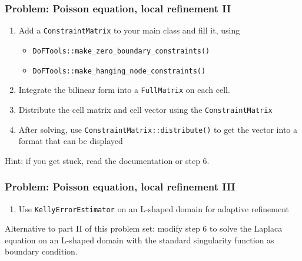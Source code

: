 \begin{frame}
  \frametitle{Problem: Poisson equation, local refinement II}
  \begin{enumerate}
  \item Add a \lstinline!ConstraintMatrix! to your main class and fill it, using
    \begin{itemize}
    \item \lstinline!DoFTools::make_zero_boundary_constraints()!
    \item \lstinline!DoFTools::make_hanging_node_constraints()!
    \end{itemize}
  \item Integrate the bilinear form into a \lstinline!FullMatrix! on
    each cell.
  \item Distribute the cell matrix and cell vector using the
    \lstinline!ConstraintMatrix!
  \item After solving, use \lstinline!ConstraintMatrix::distribute()!
    to get the vector into a format that can be displayed
  \end{enumerate}
Hint: if you get stuck, read the documentation or step 6.
\end{frame}

\begin{frame}
  \frametitle{Problem: Poisson equation, local refinement III}
  \begin{enumerate}
  \item Use \lstinline!KellyErrorEstimator! on an L-shaped domain for
    adaptive refinement
  \end{enumerate}

  Alternative to part II of this problem set: modify step 6 to solve
  the Laplaca equation on an L-shaped domain with the standard
  singularity function as boundary condition.
\end{frame}
